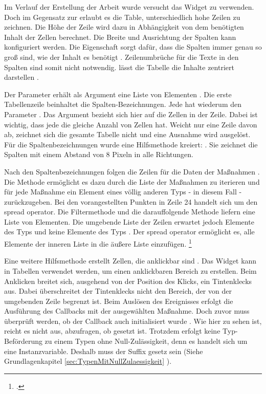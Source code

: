 Im Verlauf der Erstellung der Arbeit wurde versucht das Widget  zu verwenden.
Doch im Gegensatz zur  erlaubt es die Table, unterschiedlich hohe Zeilen zu zeichnen.
Die Höhe der Zeile wird dazu in Abhängigkeit von dem benötigten Inhalt der Zellen berechnet.
Die Breite und Ausrichtung der Spalten kann konfiguriert werden.
Die Eigenschaft  sorgt dafür, dass die Spalten immer genau so groß sind, wie der Inhalt es benötigt .  Zeilenumbrüche für die Texte in den Spalten sind somit nicht notwendig. lässt die  Tabelle die Inhalte zentriert darstellen .

Der Parameter  erhält als Argument eine Liste von  Elementen .
Die erste Tabellenzeile  beinhaltet die Spalten-Bezeichnungen.
Jede  hat wiederum den Parameter .
Das Argument bezieht sich hier auf die Zellen in der Zeile.
Dabei ist wichtig, dass jede  die gleiche Anzahl von Zellen hat.
Weicht nur eine Zeile davon ab, zeichnet sich die gesamte Tabelle nicht und eine Ausnahme wird ausgelöst.
Für die Spaltenbezeichnungen wurde eine Hilfsmethode kreiert:  .
Sie zeichnet die Spalten mit einem Abstand von 8 Pixeln in alle Richtungen.

Nach den Spaltenbezeichnungen folgen die Zeilen für die Daten der Maßnahmen .
Die Methode   ermöglicht es dazu durch die Liste der Maßnahmen zu iterieren und für jede Maßnahme ein Element eines völlig anderen Typs - in diesem Fall  - zurückzugeben.
Bei den vorangestellten Punkten  in Zeile 24 handelt sich um den spread operator. Die Filtermethode  und die darauffolgende Methode  liefern eine Liste von  Elementen. Die umgebende Liste der Zeilen   erwartet jedoch Elemente des Typs  und keine Elemente des Typs . Der spread operator ermöglicht es, alle Elemente der inneren Liste in die äußere Liste einzufügen. \footcite[Vgl.][]{SpreadOperator}

Eine weitere Hilfsmethode  erstellt Zellen, die anklickbar sind .
Das Widget   kann in Tabellen verwendet werden, um einen anklickbaren Bereich zu erstellen.
Beim  Anklicken breitet sich, ausgehend von der Position des Klicks, ein Tintenklecks  aus.
Dabei überschreitet der Tintenklecks nicht den Bereich, der von der umgebenden Zeile begrenzt ist.
Beim Auslösen des Ereignisses  erfolgt die Ausführung des Callbacks   mit der ausgewählten Maßnahme.
Doch zuvor muss überprüft werden, ob der Callback auch initialisiert wurde .
Wie hier zu sehen ist, reicht es nicht aus, abzufragen, ob   gesetzt ist.
Trotzdem erfolgt keine Typ-Beförderung zu einem Typen ohne Null-Zulässigkeit, denn es handelt sich um eine Instanzvariable.
Deshalb muss der Suffix \IC{!} gesetz sein (Siehe Grundlagenkapitel \ref{sec:TypenMitNullZulaessigkeit} ).

